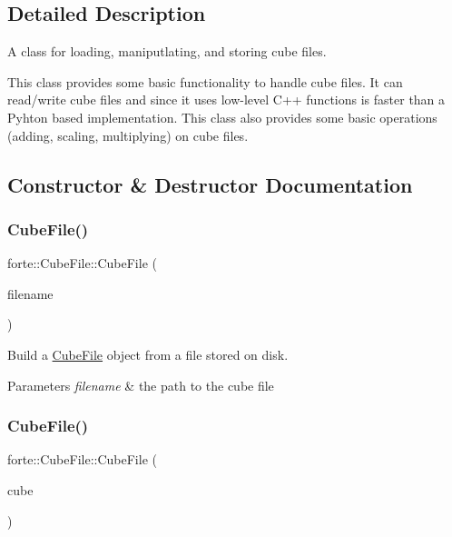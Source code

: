 \subsection{Detailed Description}
A class for loading, maniputlating, and storing cube files. 

This class provides some basic functionality to handle cube files. It can read/write cube files and since it uses low-\/level C++ functions is faster than a Pyhton based implementation. This class also provides some basic operations (adding, scaling, multiplying) on cube files. 

\subsection{Constructor \& Destructor Documentation}
\mbox{\label{classforte_1_1_cube_file_a5b182bf719f0668f4e4d59fef9140f36}} 
\subsubsection{\texorpdfstring{Cube\+File()}{CubeFile()}\hspace{0.1cm}{\footnotesize\ttfamily [1/2]}}
{\footnotesize\ttfamily forte\+::\+Cube\+File\+::\+Cube\+File (\begin{DoxyParamCaption}\item[{const std\+::string \&}]{filename }\end{DoxyParamCaption})}



Build a \mbox{\hyperlink{classforte_1_1_cube_file}{Cube\+File}} object from a file stored on disk. 


\begin{DoxyParams}{Parameters}
{\em filename} & the path to the cube file \\
\hline
\end{DoxyParams}
\mbox{\label{classforte_1_1_cube_file_ac091f6918736c043fad6e108ec209b66}} 
\subsubsection{\texorpdfstring{Cube\+File()}{CubeFile()}\hspace{0.1cm}{\footnotesize\ttfamily [2/2]}}
{\footnotesize\ttfamily forte\+::\+Cube\+File\+::\+Cube\+File (\begin{DoxyParamCaption}\item[{const \mbox{\hyperlink{classforte_1_1_cube_file}{Cube\+File}} \&}]{cube }\end{DoxyParamCaption})\hspace{0.3cm}{\ttfamily [default]}}



